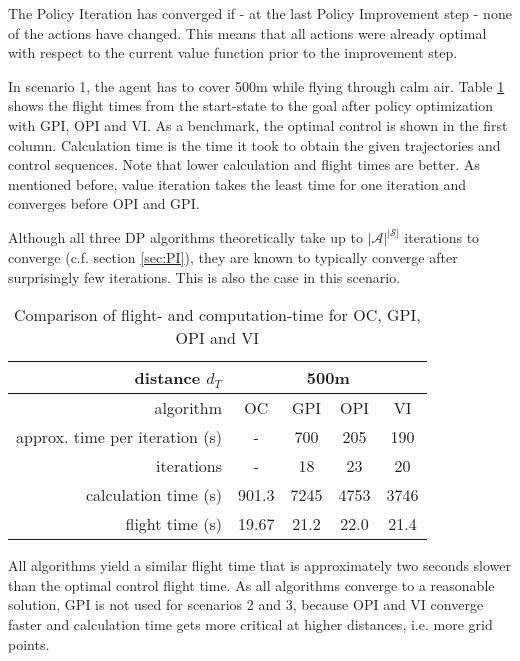 The Policy Iteration has converged if - at the last Policy Improvement step - none of the actions have changed. This means that all actions were already optimal with respect to the current value function prior to the improvement step.

In scenario 1, the agent has to cover 500m while flying through calm air. Table \ref{tab:2d_flight_data_500m} shows the flight times from the start-state to the goal after policy optimization with GPI, OPI and VI. As a benchmark, the optimal control  is shown in the first column. Calculation time is the time it took to obtain the given trajectories and control sequences. Note that lower calculation and flight times are better. As mentioned before, value iteration takes the least time for one iteration and converges before OPI and GPI.

Although all three DP algorithms theoretically take up to $|\mathcal{A}|^{|\mathcal{S}|}$ iterations to converge (c.f. section \ref{sec:PI}), they are known to typically converge after surprisingly few iterations. This is also the case in this scenario.

\begin{table}[h]
	\begin{center}
		\begin{tabular}{r|c c c c}
			distance $d_T$ & \multicolumn{4}{c}{500m} \\ \hline 
			algorithm & OC & GPI & OPI & VI \\
			approx. time per iteration (s) & - & 700 & 205 & 190 \\
			iterations & - & 18 & 23 & 20 \\
			calculation time (s) & 901.3 & 7245 & 4753 & 3746 \\
			flight time (s) & 19.67 & 21.2 & 22.0  & 21.4
		\end{tabular}
		\caption{Comparison of flight- and computation-time for OC, GPI, OPI and VI}
		\label{tab:2d_flight_data_500m}
	\end{center}
\end{table}

All algorithms yield a similar flight time that is approximately two seconds slower than the optimal control flight time. As all algorithms converge to a reasonable solution, GPI is not used for scenarios 2 and 3, because OPI and VI converge faster and calculation time gets more critical at higher distances, i.e. more grid points.

\dataOPTIfiveH

